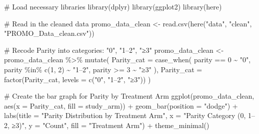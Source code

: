 \documentclass[
  letterpaper,
  DIV=11,
  numbers=noendperiod]{scrartcl}
\newenvironment{Shaded}{}{}
\newcommand{\AttributeTok}[1]{\textcolor[rgb]{0.84,0.23,0.29}{#1}}
\newcommand{\CommentTok}[1]{\textcolor[rgb]{0.42,0.45,0.49}{#1}}
\newcommand{\DecValTok}[1]{\textcolor[rgb]{0.00,0.36,0.77}{#1}}
\newcommand{\FunctionTok}[1]{\textcolor[rgb]{0.44,0.26,0.76}{#1}}
\newcommand{\NormalTok}[1]{\textcolor[rgb]{0.14,0.16,0.18}{#1}}
\newcommand{\OtherTok}[1]{\textcolor[rgb]{0.44,0.26,0.76}{#1}}
\newcommand{\SpecialCharTok}[1]{\textcolor[rgb]{0.00,0.36,0.77}{#1}}
\newcommand{\StringTok}[1]{\textcolor[rgb]{0.01,0.18,0.38}{#1}}
\begin{document}
\begin{Shaded}
\begin{Highlighting}[]
\CommentTok{\# Load necessary libraries}
\FunctionTok{library}\NormalTok{(dplyr)}
\FunctionTok{library}\NormalTok{(ggplot2)}
\FunctionTok{library}\NormalTok{(here)}

\CommentTok{\# Read in the cleaned data}
\NormalTok{promo\_data\_clean }\OtherTok{\textless{}{-}} \FunctionTok{read.csv}\NormalTok{(}\FunctionTok{here}\NormalTok{(}\StringTok{"data"}\NormalTok{, }\StringTok{"clean"}\NormalTok{, }\StringTok{"PROMO\_Data\_clean.csv"}\NormalTok{))}

\CommentTok{\# Recode Parity into categories: "0", "1–2", "≥3"}
\NormalTok{promo\_data\_clean }\OtherTok{\textless{}{-}}\NormalTok{ promo\_data\_clean }\SpecialCharTok{\%\textgreater{}\%}
  \FunctionTok{mutate}\NormalTok{(}
    \AttributeTok{Parity\_cat =} \FunctionTok{case\_when}\NormalTok{(}
\NormalTok{      parity }\SpecialCharTok{==} \DecValTok{0} \SpecialCharTok{\textasciitilde{}} \StringTok{"0"}\NormalTok{,}
\NormalTok{      parity }\SpecialCharTok{\%in\%} \FunctionTok{c}\NormalTok{(}\DecValTok{1}\NormalTok{, }\DecValTok{2}\NormalTok{) }\SpecialCharTok{\textasciitilde{}} \StringTok{"1–2"}\NormalTok{,}
\NormalTok{      parity }\SpecialCharTok{\textgreater{}=} \DecValTok{3} \SpecialCharTok{\textasciitilde{}} \StringTok{"≥3"}
\NormalTok{    ),}
    \AttributeTok{Parity\_cat =} \FunctionTok{factor}\NormalTok{(Parity\_cat, }\AttributeTok{levels =} \FunctionTok{c}\NormalTok{(}\StringTok{"0"}\NormalTok{, }\StringTok{"1–2"}\NormalTok{, }\StringTok{"≥3"}\NormalTok{))}
\NormalTok{  )}

\CommentTok{\# Create the bar graph for Parity by Treatment Arm}
\FunctionTok{ggplot}\NormalTok{(promo\_data\_clean, }\FunctionTok{aes}\NormalTok{(}\AttributeTok{x =}\NormalTok{ Parity\_cat, }\AttributeTok{fill =}\NormalTok{ study\_arm)) }\SpecialCharTok{+}
  \FunctionTok{geom\_bar}\NormalTok{(}\AttributeTok{position =} \StringTok{"dodge"}\NormalTok{) }\SpecialCharTok{+}
  \FunctionTok{labs}\NormalTok{(}\AttributeTok{title =} \StringTok{"Parity Distribution by Treatment Arm"}\NormalTok{,}
       \AttributeTok{x =} \StringTok{"Parity Category (0, 1–2, ≥3)"}\NormalTok{,}
       \AttributeTok{y =} \StringTok{"Count"}\NormalTok{,}
       \AttributeTok{fill =} \StringTok{"Treatment Arm"}\NormalTok{) }\SpecialCharTok{+}
  \FunctionTok{theme\_minimal}\NormalTok{()}
\end{Highlighting}
\end{Shaded}
\end{document}
